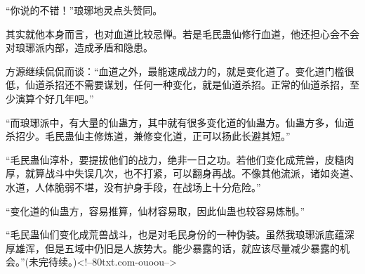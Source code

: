 \begin{this_body}
“你说的不错！”琅琊地灵点头赞同。

其实就他本身而言，也对血道比较忌惮。若是毛民蛊仙修行血道，他还担心会不会对琅琊派内部，造成矛盾和隐患。

方源继续侃侃而谈：“血道之外，最能速成战力的，就是变化道了。变化道门槛很低，仙道杀招还不需要谋划，任何一种变化，就是仙道杀招。正常的仙道杀招，至少演算个好几年吧。”

“而琅琊派中，有大量的仙蛊方，其中就有很多变化道的仙蛊方。仙蛊方多，仙道杀招少。毛民蛊仙主修炼道，兼修变化道，正可以扬此长避其短。”

“毛民蛊仙淳朴，要提拔他们的战力，绝非一日之功。若他们变化成荒兽，皮糙肉厚，就算战斗中失误几次，也不打紧，可以翻身再战。不像其他流派，诸如炎道、水道，人体脆弱不堪，没有护身手段，在战场上十分危险。”

“变化道的仙蛊方，容易推算，仙材容易取，因此仙蛊也较容易炼制。”

“毛民蛊仙们变化成荒兽战斗，也是对毛民身份的一种伪装。虽然我琅琊派底蕴深厚雄浑，但是五域中仍旧是人族势大。能少暴露的话，就应该尽量减少暴露的机会。”(未完待续。)<!--80txt.com-ouoou-->

\end{this_body}

